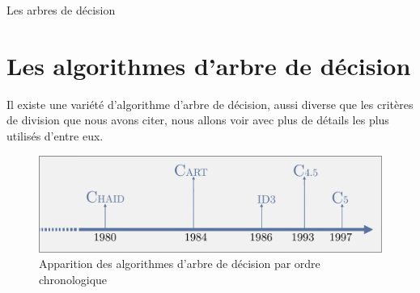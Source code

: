 \documentclass[a4paper, 11pt]{report}
\begin{document}
\begin{chapter}{Les arbres de décision}
\section{Les algorithmes d'arbre de décision}
Il existe une variété d'algorithme d'arbre de décision, aussi diverse que les critères de division que nous avons citer, nous allons voir avec plus de détails les plus utilisés d'entre eux.

\begin{figure}[!h]
\begin{center}
\includegraphics[scale=0.3]{Images/Historique}
\caption{Apparition des algorithmes d'arbre de décision par ordre chronologique}
\end{center}
\end{figure}



\end{chapter}
\end{document}
